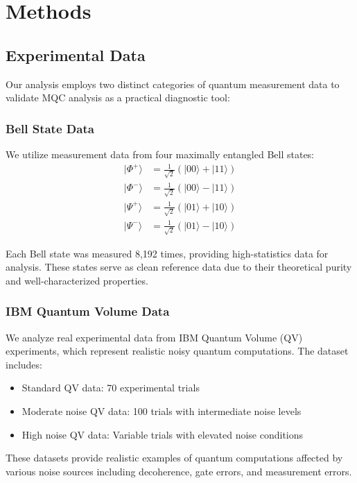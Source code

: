 \section{Methods}
\label{sec:methods}

\subsection{Experimental Data}

Our analysis employs two distinct categories of quantum measurement data to validate MQC analysis as a practical diagnostic tool:

\subsubsection{Bell State Data}
We utilize measurement data from four maximally entangled Bell states:
\begin{align}
|\Phi^+\rangle &= \frac{1}{\sqrt{2}}(|00\rangle + |11\rangle) \\
|\Phi^-\rangle &= \frac{1}{\sqrt{2}}(|00\rangle - |11\rangle) \\
|\Psi^+\rangle &= \frac{1}{\sqrt{2}}(|01\rangle + |10\rangle) \\
|\Psi^-\rangle &= \frac{1}{\sqrt{2}}(|01\rangle - |10\rangle)
\end{align}

Each Bell state was measured 8,192 times, providing high-statistics data for analysis. These states serve as clean reference data due to their theoretical purity and well-characterized properties.

\subsubsection{IBM Quantum Volume Data}
We analyze real experimental data from IBM Quantum Volume (QV) experiments, which represent realistic noisy quantum computations. The dataset includes:
\begin{itemize}
\item Standard QV data: 70 experimental trials
\item Moderate noise QV data: 100 trials with intermediate noise levels  
\item High noise QV data: Variable trials with elevated noise conditions
\end{itemize}

These datasets provide realistic examples of quantum computations affected by various noise sources including decoherence, gate errors, and measurement errors.

